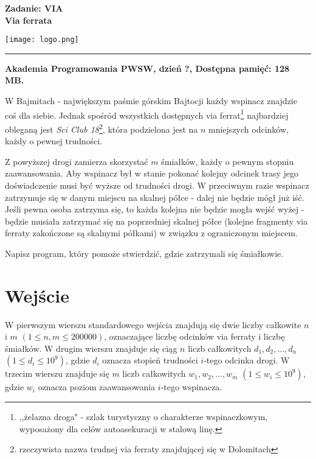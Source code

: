 \documentclass[10pt]{article}
\begin{document}
    

    \noindent
    \begin{minipage}{0.5\textwidth}
        \LARGE{\textsf{\textbf{Zadanie: VIA\\Via ferrata}}}
    \end{minipage}
    \begin{minipage}{0.5\textwidth}
        \begin{flushright}
            \texttt{[image: logo.png]}
        \end{flushright}
    \end{minipage}
    
    \noindent\rule{\textwidth}{0.4pt}
    
    \noindent\textbf{Akademia Programowania PWSW, dzień ?, Dostępna pamięć: 128 MB.}
    \vspace{1em}
    
    
    \noindent
    W Bajmitach - największym paśmie górskim Bajtocji każdy wspinacz znajdzie coś dla siebie. Jednak spośród wszystkich dostępnych via ferrat\footnote{,,żelazna droga" - szlak turystyczny o charakterze wspinaczkowym, wyposażony dla celów autoasekuracji w stalową linę.} najbardziej obleganą jest \textit{Sci Club 18}\footnote{rzeczywista nazwa trudnej via ferraty znajdującej się w Dolomitach}, która podzielona jest na $n$ mniejszych odcinków, każdy o pewnej trudności. 

    Z powyższej drogi zamierza skorzystać $m$ śmiałków, każdy o pewnym stopniu zaawansowania. Aby wspinacz był w stanie pokonać kolejny odcinek trasy jego doświadczenie musi być wyższe od trudności drogi. W przeciwnym razie wspinacz zatrzymuje się w danym miejscu na skalnej półce - dalej nie będzie mógł już iść. Jeśli pewna osoba zatrzyma się, to każda kolejna nie będzie mogła wejść wyżej - będzie musiała zatrzymać się na poprzedniej skalnej półce (kolejne fragmenty via ferraty zakończone są skalnymi półkami) w związku z ograniczonym miejscem.

    Napisz program, który pomoże stwierdzić, gdzie zatrzymali się śmiałkowie.


    \section*{Wejście}
    
    W pierwszym wierszu standardowego wejścia znajdują się dwie liczby całkowite $n$ i $m$ $(1 \leq n, m \leq 200000)$, oznaczające liczbę odcinków via ferraty i liczbę śmiałków. W drugim wierszu znajduje się ciąg $n$ liczb całkowitych $d_{1}, d_{2}, \ldots, d_{n}$ $(1 \leq d_{i} \leq 10^{9})$, gdzie $d_{i}$ oznacza stopień trudności $i$-tego odcinka drogi. W trzecim wierszu znajduje się $m$ liczb całkowitych $w_{1}, w_{2}, \ldots, w_{m}$ $(1 \leq w_{i} \leq 10^{9})$, gdzie $w_{i}$ oznacza poziom zaawansowania $i$-tego wspinacza.
\end{document}
